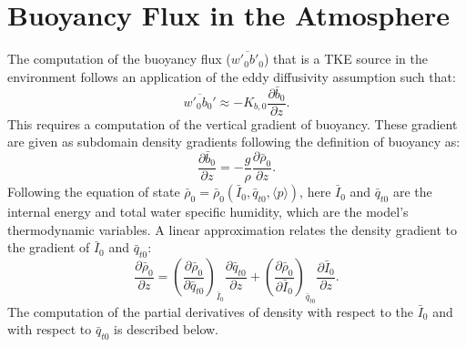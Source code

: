 \documentclass{report}
\begin{document}
\section{Buoyancy Flux in the Atmosphere}
\label{appx:high order moment terms}
The computation of the buoyancy flux ($\overline{w'_0 b'_0}$) that is a TKE source in the environment follows an application of the eddy diffusivity assumption such that:
\begin{equation}
\label{eq:vertical_eddy_diffusivty_buoyancy} 
\overline{w'_0 b_0'} \approx - K_{b, 0} \frac{\partial \bar{b}_0}{\partial z}.
\end{equation}
This requires a computation of the vertical gradient of buoyancy. These gradient are given as subdomain density gradients following the definition of buoyancy as:
\begin{equation}
\label{eq:buoyancy_grda} 
\frac{\partial \bar{b}_0}{\partial z} = - \frac{g}{\rho} \frac{\partial \bar{\rho}_0}{\partial z} .
\end{equation}
Following the equation of state $\bar{\rho}_0 = \bar{\rho}_0(\bar{I}_0, \bar{q}_{t0}, \langle p \rangle)$, here $\bar{I}_0$ and $\bar{q}_{t0}$ are the internal energy and total water  specific humidity, which are the model's thermodynamic variables. A linear approximation relates the density gradient to the gradient of $\bar{I}_0$ and $\bar{q}_{t0}$:
\begin{equation}
\label{eq:density_grad} 
\frac{\partial \bar{\rho}_0}{\partial z}  = \left( \frac{\partial \bar{\rho}_0}{\partial \bar{q}_{t0}} \right)_{\bar{I}_0} \frac{\partial \bar{q}_{t0}}{\partial z} + \left( \frac{\partial \bar{\rho}_0}{\partial \bar{I}_0}\right)_{\bar{q}_{t0}} \frac{\partial \bar{I}_0}{\partial z}  .
\end{equation}
The computation of the partial derivatives of density with respect to the $\bar{I}_0$ and with respect to $\bar{q}_{t0}$ is described below.
\end{document}
